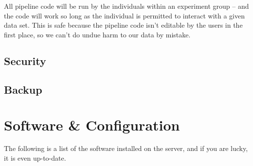 \documentclass[final,titlepage,letterpaper,oneside,12pt]{article}
\begin{document}
All pipeline code will be run by the individuals within an experiment group -- and the code will work so long as the individual is permitted to interact with a given data set. This is safe because the pipeline code isn't editable by the users in the first place, so we can't do undue harm to our data by mistake.

\subsection{Security}
\subsection{Backup}

\section{Software \& Configuration}

The following is a list of the software installed on the server, and if you are lucky, it is even up-to-date.
\end{document}
